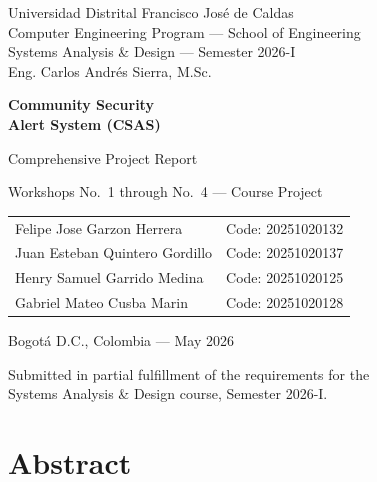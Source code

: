\documentclass[11pt,a4paper]{article}
\begin{document}
\begin{titlepage}
\centering
\vspace*{1cm}
{\large Universidad Distrital Francisco Jos\'e de Caldas\\
Computer Engineering Program --- School of Engineering\\
Systems Analysis \& Design --- Semester 2026-I\\
Eng. Carlos Andr\'es Sierra, M.Sc.}

\vspace{2cm}
{\Huge\bfseries\color{udblue} Community Security\\Alert System (CSAS)}

\vspace{0.8cm}
{\Large\color{accent} Comprehensive Project Report}

\vspace{0.5cm}
{\large Workshops No.\ 1 through No.\ 4 --- Course Project}

\vspace{2cm}
\begin{tabular}{l l}
Felipe Jose Garzon Herrera & Code: 20251020132 \\
Juan Esteban Quintero Gordillo & Code: 20251020137 \\
Henry Samuel Garrido Medina & Code: 20251020125 \\
Gabriel Mateo Cusba Marin & Code: 20251020128 \\
\end{tabular}

\vfill
Bogot\'a D.C., Colombia --- May 2026

\vspace{0.5cm}
{\small Submitted in partial fulfillment of the requirements for the\\
Systems Analysis \& Design course, Semester 2026-I.}
\end{titlepage}

\newpage
\section*{Abstract}
\end{document}
